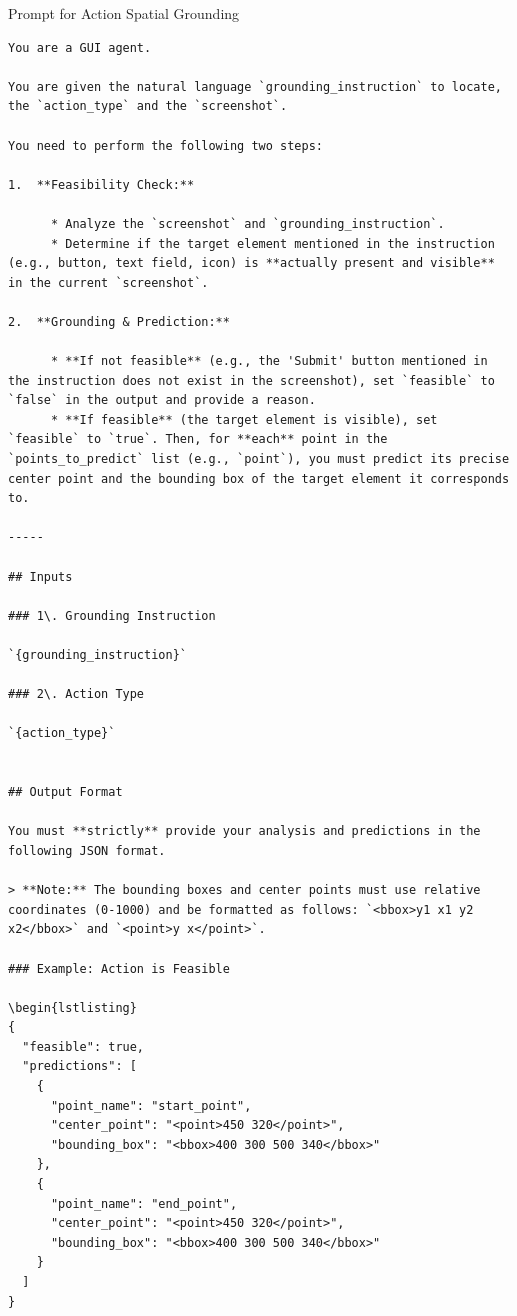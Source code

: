 \documentclass{llmxive}
\begin{document}
\begin{promptbox}{Prompt for Action Spatial Grounding}
\begin{lstlisting}
You are a GUI agent.

You are given the natural language `grounding_instruction` to locate, the `action_type` and the `screenshot`. 

You need to perform the following two steps:

1.  **Feasibility Check:**

      * Analyze the `screenshot` and `grounding_instruction`.
      * Determine if the target element mentioned in the instruction (e.g., button, text field, icon) is **actually present and visible** in the current `screenshot`.

2.  **Grounding & Prediction:**

      * **If not feasible** (e.g., the 'Submit' button mentioned in the instruction does not exist in the screenshot), set `feasible` to `false` in the output and provide a reason.
      * **If feasible** (the target element is visible), set `feasible` to `true`. Then, for **each** point in the `points_to_predict` list (e.g., `point`), you must predict its precise center point and the bounding box of the target element it corresponds to.

-----

## Inputs

### 1\. Grounding Instruction

`{grounding_instruction}`

### 2\. Action Type

`{action_type}`


## Output Format

You must **strictly** provide your analysis and predictions in the following JSON format.

> **Note:** The bounding boxes and center points must use relative coordinates (0-1000) and be formatted as follows: `<bbox>y1 x1 y2 x2</bbox>` and `<point>y x</point>`.

### Example: Action is Feasible

\begin{lstlisting}
{
  "feasible": true,
  "predictions": [
    {
      "point_name": "start_point",
      "center_point": "<point>450 320</point>",
      "bounding_box": "<bbox>400 300 500 340</bbox>"
    },
    {
      "point_name": "end_point",
      "center_point": "<point>450 320</point>",
      "bounding_box": "<bbox>400 300 500 340</bbox>"
    }
  ]
}
\end{lstlisting}


\end{promptbox}
\end{document}
